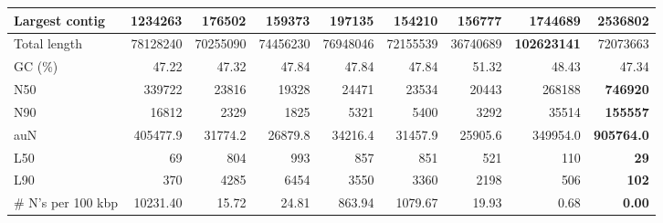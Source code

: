 \documentclass[12pt,a4paper]{article}
\begin{document}
\begin{table}[ht]
\begin{center}
\begin{tabular}{|l*{8}{|r}|}
Largest contig & 1234263 & 176502 & 159373 & 197135 & 154210 & 156777 & 1744689 & {\bf 2536802} \\ \hline
Total length & 78128240 & 70255090 & 74456230 & 76948046 & 72155539 & 36740689 & {\bf 102623141} & 72073663 \\ \hline
GC (\%) & 47.22 & 47.32 & 47.84 & 47.84 & 47.84 & 51.32 & 48.43 & 47.34 \\ \hline
N50 & 339722 & 23816 & 19328 & 24471 & 23534 & 20443 & 268188 & {\bf 746920} \\ \hline
N90 & 16812 & 2329 & 1825 & 5321 & 5400 & 3292 & 35514 & {\bf 155557} \\ \hline
auN & 405477.9 & 31774.2 & 26879.8 & 34216.4 & 31457.9 & 25905.6 & 349954.0 & {\bf 905764.0} \\ \hline
L50 & 69 & 804 & 993 & 857 & 851 & 521 & 110 & {\bf 29} \\ \hline
L90 & 370 & 4285 & 6454 & 3550 & 3360 & 2198 & 506 & {\bf 102} \\ \hline
\# N's per 100 kbp & 10231.40 & 15.72 & 24.81 & 863.94 & 1079.67 & 19.93 & 0.68 & {\bf 0.00} \\ \hline
\end{tabular}
\end{center}
\end{table}
\end{document}
